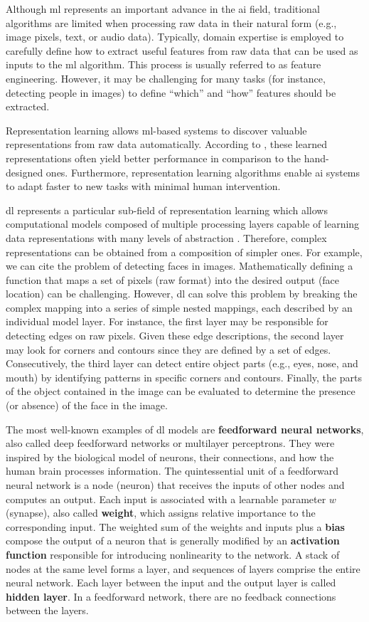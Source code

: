 Although \acl{ml} represents an important advance in the \acs{ai} field, traditional algorithms are limited when processing raw data in their natural form (e.g., image pixels, text, or audio data). Typically, domain expertise is employed to carefully define how to extract useful features from raw data that can be used as inputs to the \acs{ml} algorithm. This process is usually referred to as feature engineering. However, it may be challenging for many tasks (for instance, detecting people in images) to define ``which'' and ``how'' features should be extracted.

Representation learning allows \acs{ml}-based systems to discover valuable representations from raw data automatically. According to \cite{goodfellow2016deep}, these learned representations often yield better performance in comparison to the hand-designed ones. Furthermore, representation learning algorithms enable \acs{ai} systems to adapt faster to new tasks with minimal human intervention.

\acf{dl} represents a particular sub-field of representation learning which allows computational models composed of multiple processing layers capable of learning data representations with many levels of abstraction \citep{lecun2015deep}. Therefore, complex representations can be obtained from a composition of simpler ones. For example, we can cite the problem of detecting faces in images. Mathematically defining a function that maps a set of pixels (raw format) into the desired output (face location) can be challenging. However, \acl{dl} can solve this problem by breaking the complex mapping into a series of simple nested mappings, each described by an individual model layer. For instance, the first layer may be responsible for detecting edges on raw pixels. Given these edge descriptions, the second layer may look for corners and contours since they are defined by a set of edges. Consecutively, the third layer can detect entire object parts (e.g., eyes, nose, and mouth) by identifying patterns in specific corners and contours. Finally, the parts of the object contained in the image can be evaluated to determine the presence (or absence) of the face in the image.

The most well-known examples of \acl{dl} models are \textbf{feedforward neural networks}, also called deep feedforward networks or multilayer perceptrons. They were inspired by the biological model of neurons, their connections, and how the human brain processes information. The quintessential unit of a feedforward neural network is a node (neuron) that receives the inputs of other nodes and computes an output. Each input is associated with a learnable parameter $w$ (synapse), also called \textbf{weight}, which assigns relative importance to the corresponding input. The weighted sum of the weights and inputs plus a \textbf{bias} compose the output of a neuron that is generally modified by an \textbf{activation function} responsible for introducing nonlinearity to the network. A stack of nodes at the same level forms a layer, and sequences of layers comprise the entire neural network. Each layer between the input and the output layer is called \textbf{hidden layer}. In a feedforward network, there are no feedback connections between the layers.

